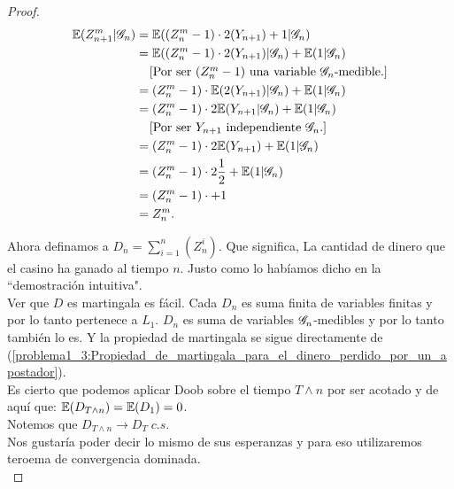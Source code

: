 \begin{proof}
			\begin{align}\label{problema1_3:Propiedad_de_martingala_para_el_dinero_perdido_por_un_apostador}
				\mathbb{E}(Z_{n+1}^{m} | \mathscr{G}_n) &= \mathbb{E}((Z_n^{m} - 1) \cdot 2(Y_{n+1}) + 1 | \mathscr{G}_n)\\
				                       &= \mathbb{E}((Z_n^{m} -1) \cdot 2(Y_{n+1}) | \mathscr{G}_n) + \mathbb{E}( 1 | \mathscr{G}_n)\\
				                       &\;\;\;\;\mbox{[Por ser $(Z_n^{m} - 1)$ una variable $\mathscr{G}_n$-medible.]}\\
				                       &= (Z_n^{m} -1) \cdot \mathbb{E}(  2(Y_{n+1}) | \mathscr{G}_n) + \mathbb{E}( 1 | \mathscr{G}_n)\\
				                       &= (Z_n^{m} -1) \cdot 2\mathbb{E}( Y_{n+1} | \mathscr{G}_n) + \mathbb{E}( 1 | \mathscr{G}_n)\\
				                       &\;\;\;\;\mbox{[Por ser $Y_{n + 1}$ independiente $\mathscr{G}_n$.]}\\
				                       &= (Z_n^{m} -1) \cdot 2\mathbb{E}( Y_{n+1}) + \mathbb{E}( 1 | \mathscr{G}_n)\\
				                       &= (Z_n^{m} -1) \cdot 2 \frac{1}{2} + \mathbb{E}( 1 | \mathscr{G}_n)\\
				                       &= (Z_n^{m} -1) \cdot + 1 \\
				                       &= Z_n^m.
			\end{align}
			
			Ahora definamos a $D_n = \sum_{i=1}^n (Z_n^i)$. Que significa, La cantidad de dinero que el casino ha ganado al tiempo $n$. 
			Justo como lo habíamos dicho en la ``demostración intuitiva".\\
			
			Ver que $D$ es martingala es fácil. Cada $D_n$ es suma finita de variables finitas y por lo tanto pertenece a $L_1$.
			$D_n$ es suma de variables $\mathscr{G}_n$-medibles y por lo tanto también lo es. Y la propiedad de martingala se sigue directamente de
			(\ref{problema1_3:Propiedad_de_martingala_para_el_dinero_perdido_por_un_apostador}).\\
			
		    Es cierto que podemos aplicar Doob sobre el tiempo $T \wedge n$ por ser acotado y de aquí que:
		    $\mathbb{E}(D_{T \wedge n}) = \mathbb{E}(D_1) = 0$.\\
		    
		    Notemos que $D_{T \wedge n} \longrightarrow D_T \; c.s.$\\
		    
		    Nos gustaría poder decir lo mismo de sus esperanzas y para eso utilizaremos teroema de convergencia dominada.\\
		    

\end{proof}
